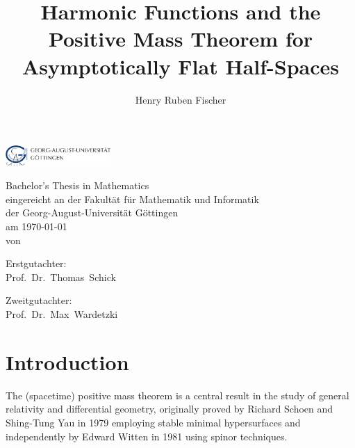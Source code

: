 \documentclass[titlepage,numbers=noenddot,headinclude,oneside,%
footinclude=true,cleardoublepage=empty,%
BCOR=5mm,paper=a4,fontsize=11pt,%
english,%
]{scrartcl}
\title{Harmonic Functions and the Positive Mass Theorem for Asymptotically Flat Half-Spaces}
\author{Henry Ruben Fischer}
\begin{document}
\theoremstyle{plain}
\makeatletter
\begin{titlepage}
\begin{center}

\textsc{\LARGE \@title}

\vspace{2cm}

\includegraphics[width=0.3\textwidth]{Logo.pdf}

\vspace{1.5cm}

\Large Bachelor's Thesis in Mathematics \\
\Large eingereicht an der Fakultät für Mathematik und Informatik\\
\Large der Georg-August-Universität Göttingen\\
am \today\\

\vspace{1cm}
\small{von}\\

\large{\@author}
\vspace{1cm}

\small{Erstgutachter:}\\

\large{Prof.~Dr.~Thomas~Schick}

\vspace{1cm}

\small{Zweitgutachter:}\\

\large{Prof.~Dr.~Max~Wardetzki}

\end{center}
\end{titlepage}
\makeatother

\tableofcontents
\newpage
{}
\section{Introduction}


The (spacetime) positive mass theorem is a central result in the study of general relativity and differential geometry, originally proved by Richard Schoen and Shing-Tung Yau in 1979 \parencite{schoenProofPositiveMass1979} employing stable minimal hypersurfaces and independently by Edward Witten in 1981 \parencite{wittenNewProofPositive1981} using spinor techniques.
\end{document}
